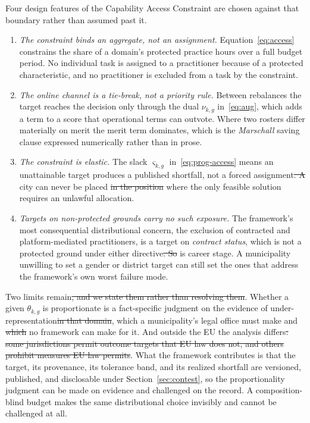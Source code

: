 \documentclass[utf8]{FrontiersinHarvard}
\providecommand{\DIFadd}[1]{{\protect\color{blue}\uwave{#1}}} %
\providecommand{\DIFdel}[1]{{\protect\color{red}\sout{#1}}}                      %
\providecommand{\DIFaddbegin}{} %
\providecommand{\DIFaddend}{} %
\providecommand{\DIFdelbegin}{} %
\providecommand{\DIFdelend}{} %
\begin{document}
\DIFdelend Four design features of the Capability Access Constraint are chosen against that boundary rather than assumed past it.

	\begin{enumerate}
		\item \textit{The constraint binds an aggregate, not an assignment.} Equation~\eqref{eq:access} constrains the share of a domain's protected practice hours over a full budget period. No individual task is assigned to a practitioner because of a protected characteristic, and no practitioner is excluded from a task by the constraint.
		\item \textit{The online channel is a tie-break, not a priority rule.} Between rebalances the target reaches the decision only through the dual $\nu_{k,g}$ in~\eqref{eq:aug}, which adds a term to a score that operational terms can outvote. Where two rosters differ materially on merit the merit term dominates, which is the \textit{Marschall} saving clause expressed numerically rather than in prose.
		\item \textit{The constraint is elastic.} The slack $\varsigma_{k,g}$ in~\eqref{eq:prog-access} means an unattainable target produces a published shortfall, not a forced assignment\DIFdelbegin \DIFdel{. A }\DIFdelend \DIFaddbegin \DIFadd{, so a }\DIFaddend city can never be placed \DIFdelbegin \DIFdel{in the position }\DIFdelend where the only feasible solution requires an unlawful allocation.
		\item \textit{Targets on non-protected grounds carry no such exposure.} The framework's most consequential distributional concern, the exclusion of contracted and platform-mediated practitioners, is a target on \textit{contract status}, which is not a protected ground under either directive\DIFdelbegin \DIFdel{. So }\DIFdelend \DIFaddbegin \DIFadd{; nor }\DIFaddend is career stage. A municipality unwilling to set a gender or district target can still set the ones that address the framework's own worst failure mode.
	\end{enumerate}

	Two limits remain\DIFdelbegin \DIFdel{, and we state them rather than resolving them}\DIFdelend . Whether a given $\theta_{k,g}$ is proportionate is a fact-specific judgment on the evidence of under-representation\DIFdelbegin \DIFdel{in that domain}\DIFdelend , which a municipality's legal office must make and \DIFdelbegin \DIFdel{which }\DIFdelend no framework can make for it. And outside the EU the analysis differs\DIFdelbegin \DIFdel{: some jurisdictions permit outcome targets that EU law does not, and others prohibit measures EU law permits}\DIFdelend \DIFaddbegin \DIFadd{, as the next subsection shows for the Gulf}\DIFaddend . What the framework contributes is that the target, its provenance, its tolerance band, and its realized shortfall are versioned, published, and disclosable under Section~\ref{sec:contest}, so the proportionality judgment can be made on evidence and challenged on the record. A composition-blind budget makes the same distributional choice invisibly and cannot be challenged at all.
\end{document}
